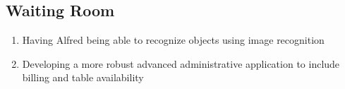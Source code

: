\documentclass [11pt]{article}
\begin{document}
\subsection{Waiting Room}
	\begin{enumerate}[label=\textbf{(\roman*)}]
		\item Having Alfred being able to recognize objects using image recognition
		\item Developing a more robust advanced administrative application to include billing and table availability
	    \end{enumerate} 

\end{document}
